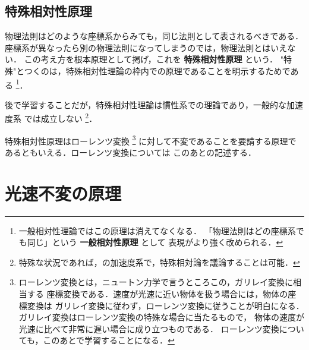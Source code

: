         \subsection{特殊相対性原理}
            物理法則はどのような座標系からみても，同じ法則として表されるべきである．
            座標系が異なったら別の物理法則になってしまうのでは，物理法則とはいえない．
            この考え方を根本原理として掲げ，これを \textbf{特殊相対性原理} という．
            "特殊"とつくのは，特殊相対性理論の枠内での原理であることを明示するためである
                \footnote{
                    一般相対性理論ではこの原理は消えてなくなる．
                    「物理法則はどの座標系でも同じ」という \textbf{一般相対性原理} として
                    表現がより強く改められる．
                }．

            後で学習することだが，特殊相対性理論は慣性系での理論であり，一般的な加速度系
            では成立しない
                \footnote{
                    特殊な状況であれば，の加速度系で，特殊相対論を議論することは可能．
                }．

            特殊相対性原理はローレンツ変換
                \footnote{
                    ローレンツ変換とは，ニュートン力学で言うところこの，ガリレイ変換に相当する
                    座標変換である．速度が光速に近い物体を扱う場合には，物体の座標変換は
                    ガリレイ変換に従わず，ローレンツ変換に従うことが明白になる．
                    ガリレイ変換はローレンツ変換の特殊な場合に当たるもので，
                    物体の速度が光速に比べて非常に遅い場合に成り立つものである．
                    ローレンツ変換についても，このあとで学習することになる．
                }
            に対して不変であることを要請する原理であるともいえる．ローレンツ変換については
            このあとの記述する．


    \section{光速不変の原理}
